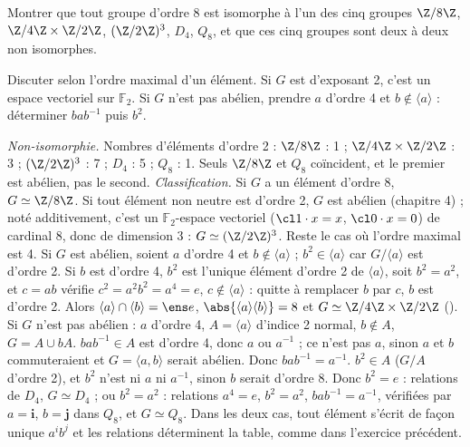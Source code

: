 \begin{exo}
Montrer que tout groupe d'ordre 8 est isomorphe à l'un des cinq groupes $\Z/8\Z$, $\Z/4\Z\times\Z/2\Z$, $(\Z/2\Z)^3$, $D_4$, $Q_8$, et que ces cinq groupes sont deux à deux non isomorphes.
\begin{indication}
Discuter selon l'ordre maximal d'un élément. Si $G$ est d'exposant 2, c'est un espace vectoriel sur $\mathbb F_2$. Si $G$ n'est pas abélien, prendre $a$ d'ordre 4 et $b\notin\langle a\rangle$ : déterminer $bab^{-1}$ puis $b^2$.
\end{indication}
\begin{corrige}
\emph{Non-isomorphie.} Nombres d'éléments d'ordre 2 : $\Z/8\Z$ : 1 ; $\Z/4\Z\times\Z/2\Z$ : 3 ; $(\Z/2\Z)^3$ : 7 ; $D_4$ : 5 ; $Q_8$ : 1. Seuls $\Z/8\Z$ et $Q_8$ coïncident, et le premier est abélien, pas le second.
\emph{Classification.} Si $G$ a un élément d'ordre 8, $G\simeq\Z/8\Z$. Si tout élément non neutre est d'ordre 2, $G$ est abélien (chapitre 4) ; noté additivement, c'est un $\mathbb F_2$-espace vectoriel ($\cl1\cdot x=x$, $\cl0\cdot x=0$) de cardinal 8, donc de dimension 3 : $G\simeq(\Z/2\Z)^3$. Reste le cas où l'ordre maximal est 4. Si $G$ est abélien, soient $a$ d'ordre 4 et $b\notin\langle a\rangle$ ; $b^2\in\langle a\rangle$ car $G/\langle a\rangle$ est d'ordre 2. Si $b$ est d'ordre 4, $b^2$ est l'unique élément d'ordre 2 de $\langle a\rangle$, soit $b^2=a^2$, et $c=ab$ vérifie $c^2=a^2b^2=a^4=e$, $c\notin\langle a\rangle$ : quitte à remplacer $b$ par $c$, $b$ est d'ordre 2. Alors $\langle a\rangle\cap\langle b\rangle=\ens e$, $\abs{\langle a\rangle\langle b\rangle}=8$ et $G\simeq\Z/4\Z\times\Z/2\Z$ (). Si $G$ n'est pas abélien : $a$ d'ordre 4, $A=\langle a\rangle$ d'indice 2 normal, $b\notin A$, $G=A\cup bA$. $bab^{-1}\in A$ est d'ordre 4, donc $a$ ou $a^{-1}$ ; ce n'est pas $a$, sinon $a$ et $b$ commuteraient et $G=\langle a,b\rangle$ serait abélien. Donc $bab^{-1}=a^{-1}$. $b^2\in A$ ($G/A$ d'ordre 2), et $b^2$ n'est ni $a$ ni $a^{-1}$, sinon $b$ serait d'ordre 8. Donc $b^2=e$ : relations de $D_4$, $G\simeq D_4$ ; ou $b^2=a^2$ : relations $a^4=e$, $b^2=a^2$, $bab^{-1}=a^{-1}$, vérifiées par $a=\mathbf i$, $b=\mathbf j$ dans $Q_8$, et $G\simeq Q_8$. Dans les deux cas, tout élément s'écrit de façon unique $a^ib^j$ et les relations déterminent la table, comme dans l'exercice précédent.
\end{corrige}
\end{exo}

